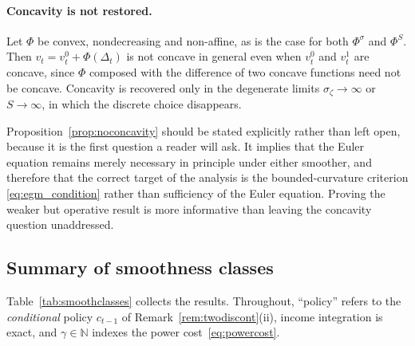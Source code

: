 \paragraph{Concavity is not restored.}

\begin{proposition}
\label{prop:noconcavity}
Let $\Phi$ be convex, nondecreasing and non-affine, as is the case for both
$\Phi^{\sigma}$ and $\Phi^{S}$. Then $v_t=v_t^{0}+\Phi(\Delta_t)$ is not concave in
general even when $v_t^{0}$ and $v_t^{1}$ are concave, since $\Phi$ composed with the
difference of two concave functions need not be concave. Concavity is recovered only in
the degenerate limits $\sigma_\zeta\to\infty$ or $S\to\infty$, in which the
discrete choice disappears.
\end{proposition}

Proposition~\ref{prop:noconcavity} should be stated explicitly rather than left open,
because it is the first question a reader will ask. It implies that the Euler equation
remains merely necessary in principle under either smoother, and therefore that the
correct target of the analysis is the bounded-curvature criterion
\eqref{eq:egm_condition} rather than sufficiency of the Euler equation. Proving the
weaker but operative result is more informative than leaving the concavity question
unaddressed.

\subsection{Summary of smoothness classes}
\label{subsec:smooth_summary}

Table~\ref{tab:smoothclasses} collects the results. Throughout, ``policy'' refers to
the \emph{conditional} policy $c_{t-1}$ of Remark~\ref{rem:twodiscont}(ii), income
integration is exact, and $\gamma\in\mathbb{N}$ indexes the power
cost~\eqref{eq:powercost}.

